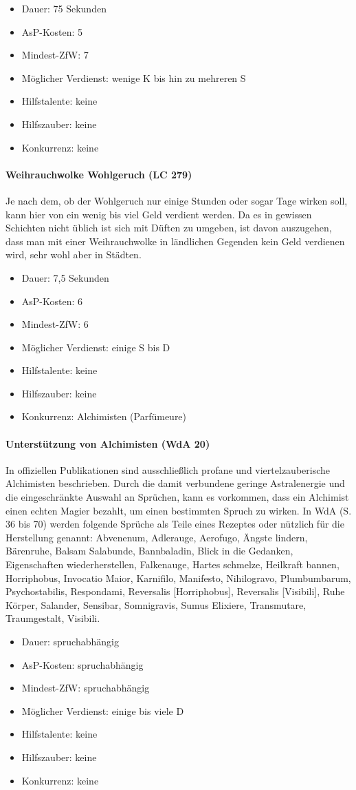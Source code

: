 \begin{itemize}
	\item Dauer: 75 Sekunden
	\item AsP-Kosten: 5
	\item Mindest-ZfW: 7
	\item Möglicher Verdienst: wenige K bis hin zu mehreren S
	\item Hilfstalente: keine
	\item Hilfszauber: keine
	\item Konkurrenz: keine
\end{itemize}

\paragraph{Weihrauchwolke Wohlgeruch (LC 279)}
Je nach dem, ob der Wohlgeruch nur einige Stunden oder sogar Tage wirken soll, kann hier von ein wenig bis viel Geld verdient werden. Da es in gewissen Schichten nicht üblich ist sich mit Düften zu umgeben, ist davon auszugehen, dass man mit einer Weihrauchwolke in ländlichen Gegenden kein Geld verdienen wird, sehr wohl aber in Städten.

\begin{itemize}
	\item Dauer: 7,5 Sekunden
	\item AsP-Kosten: 6
	\item Mindest-ZfW: 6
	\item Möglicher Verdienst: einige S bis D
	\item Hilfstalente: keine
	\item Hilfszauber: keine
	\item Konkurrenz: Alchimisten (Parfümeure)
\end{itemize}

\paragraph{Unterstützung von Alchimisten (WdA 20)}
In offiziellen Publikationen sind ausschließlich profane und viertelzauberische Alchimisten beschrieben. Durch die damit verbundene geringe Astralenergie und die eingeschränkte Auswahl an Sprüchen, kann es vorkommen, dass ein Alchimist einen echten Magier bezahlt, um einen bestimmten Spruch zu wirken. In WdA (S. 36 bis 70) werden folgende Sprüche als Teile eines Rezeptes oder nützlich für die Herstellung genannt: Abvenenum, Adlerauge, Aerofugo, Ängste lindern, Bärenruhe, Balsam Salabunde, Bannbaladin, Blick in die Gedanken, Eigenschaften wiederherstellen, Falkenauge, Hartes schmelze, Heilkraft bannen, Horriphobus, Invocatio Maior, Karnifilo, Manifesto, Nihilogravo, Plumbumbarum, Psychostabilis, Respondami, Reversalis [Horriphobus], Reversalis [Visibili], Ruhe Körper, Salander, Sensibar, Somnigravis, Sumus Elixiere, Transmutare, Traumgestalt, Visibili.

\begin{itemize}
	\item Dauer: spruchabhängig
	\item AsP-Kosten: spruchabhängig
	\item Mindest-ZfW: spruchabhängig
	\item Möglicher Verdienst: einige bis viele D
	\item Hilfstalente: keine
	\item Hilfszauber: keine
	\item Konkurrenz: keine
\end{itemize}